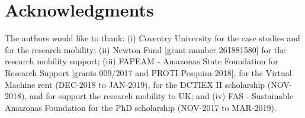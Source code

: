 \documentclass[review]{elsarticle}
\begin{document}
%
%
\section*{Acknowledgments}
The authors would like to thank: (i) Coventry University for the case studies and for the research mobility; (ii) Newton Fund [grant number 261881580] for the research mobility support; (iii) FAPEAM - Amazonas State Foundation for Research Support [grants 009/2017 and PROTI-Pesquisa 2018], for the Virtual Machine rent (DEC-2018 to JAN-2019), for the DCTIEX II scholarship (NOV-2018), and for support the research mobility to UK; and (iv) FAS - Sustainable Amazonas Foundation for the PhD scholarship (NOV-2017 to MAR-2019).


%

\end{document}
